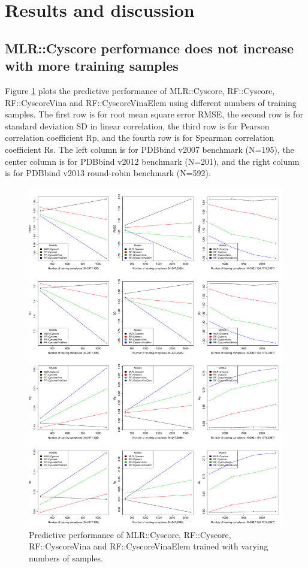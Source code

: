 \section{Results and discussion}

\subsection{MLR::Cyscore performance does not increase with more training samples}

Figure \ref{rfcyscore:stat} plots the predictive performance of MLR::Cyscore, RF::Cyscore, RF::CyscoreVina and RF::CyscoreVinaElem using different numbers of training samples. The first row is for root mean square error RMSE, the second row is for standard deviation SD in linear correlation, the third row is for Pearson correlation coefficient Rp, and the fourth row is for Spearman correlation coefficient Rs. The left column is for PDBbind v2007 benchmark (N=195), the center column is for PDBbind v2012 benchmark (N=201), and the right column is for PDBbind v2013 round-robin benchmark (N=592).

\begin{figure}
\includegraphics[width=\linewidth]{../rfcyscore/stat.pdf}
\caption{Predictive performance of MLR::Cyscore, RF::Cyscore, RF::CyscoreVina and RF::CyscoreVinaElem trained with varying numbers of samples.}
\label{rfcyscore:stat}
\end{figure}


